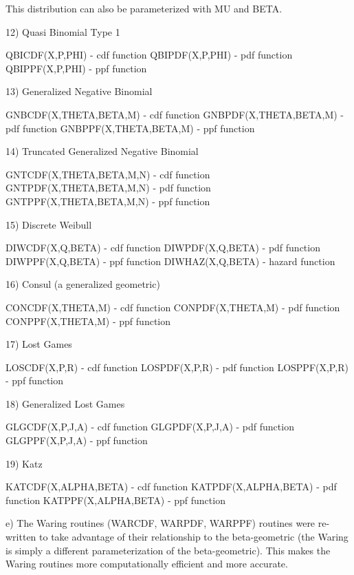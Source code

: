 {           This distribution can also be parameterized with
           MU and BETA.

       12) Quasi Binomial Type 1

           QBICDF(X,P,PHI)              - cdf function
           QBIPDF(X,P,PHI)              - pdf function
           QBIPPF(X,P,PHI)              - ppf function

       13) Generalized Negative Binomial

           GNBCDF(X,THETA,BETA,M)       - cdf function
           GNBPDF(X,THETA,BETA,M)       - pdf function
           GNBPPF(X,THETA,BETA,M)       - ppf function

       14) Truncated Generalized Negative Binomial

           GNTCDF(X,THETA,BETA,M,N)     - cdf function
           GNTPDF(X,THETA,BETA,M,N)     - pdf function
           GNTPPF(X,THETA,BETA,M,N)     - ppf function

       15) Discrete Weibull

           DIWCDF(X,Q,BETA)             - cdf function
           DIWPDF(X,Q,BETA)             - pdf function
           DIWPPF(X,Q,BETA)             - ppf function
           DIWHAZ(X,Q,BETA)             - hazard function
 
       16) Consul (a generalized geometric)

           CONCDF(X,THETA,M)            - cdf function
           CONPDF(X,THETA,M)            - pdf function
           CONPPF(X,THETA,M)            - ppf function
 
       17) Lost Games
 
           LOSCDF(X,P,R)                - cdf function
           LOSPDF(X,P,R)                - pdf function
           LOSPPF(X,P,R)                - ppf function
 
       18) Generalized Lost Games
 
           GLGCDF(X,P,J,A)              - cdf function
           GLGPDF(X,P,J,A)              - pdf function
           GLGPPF(X,P,J,A)              - ppf function
 
       19) Katz
 
           KATCDF(X,ALPHA,BETA)         - cdf function
           KATPDF(X,ALPHA,BETA)         - pdf function
           KATPPF(X,ALPHA,BETA)         - ppf function
 
    e) The Waring routines (WARCDF, WARPDF, WARPPF) routines
       were re-written to take advantage of their relationship
       to the beta-geometric (the Waring is simply a different
       parameterization of the beta-geometric).  This makes
       the Waring routines more computationally efficient and
       more accurate.

}
